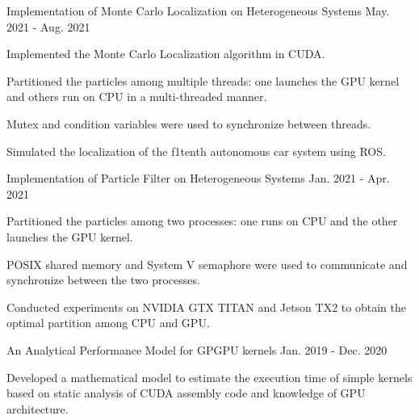 
\begin{cventries}

  \cvresearchentry
  {Implementation of Monte Carlo Localization on Heterogeneous Systems} %
  {May. 2021 - Aug. 2021} %
  {%
    \begin{cvitems}
    \item Implemented the Monte Carlo Localization algorithm in CUDA.
    \item Partitioned the particles among multiple threads: one launches the
      GPU kernel and others run on CPU in a multi-threaded manner.
    \item Mutex and condition variables were used to synchronize between threads.
    \item Simulated the localization of the f1tenth autonomous car system using ROS.
    \end{cvitems}
  }

  \cvresearchentry
  {Implementation of Particle Filter on Heterogeneous Systems} %
  {Jan. 2021 - Apr. 2021} %
  {%
    \begin{cvitems}
    \item Partitioned the particles among two processes: one runs on CPU and the
      other launches the GPU kernel.
    \item POSIX shared memory and System V semaphore were used to communicate and
      synchronize between the two processes.
    \item Conducted experiments on NVIDIA GTX TITAN and Jetson TX2 to obtain the
      optimal partition among CPU and GPU.
    \end{cvitems}
  }

  \cvresearchentry
  {An Analytical Performance Model for GPGPU kernels} %
  {Jan. 2019 - Dec. 2020} %
  {%
    \begin{cvitems}
    \item Developed a mathematical model to estimate the execution time of simple
      kernels based on static analysis of CUDA assembly code and knowledge of GPU
      architecture.
    \end{cvitems}
  }


\end{cventries}
